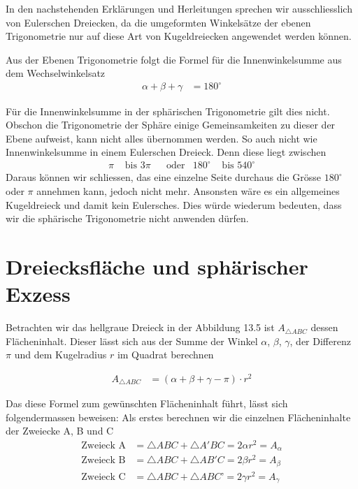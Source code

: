 \begin{refsection}
In den nachstehenden Erklärungen und Herleitungen sprechen wir ausschliesslich von Eulerschen Dreiecken, da die umgeformten Winkelsätze der ebenen Trigonometrie nur auf diese Art von Kugeldreiecken angewendet werden können.

Aus der Ebenen Trigonometrie folgt die Formel für die Innenwinkelsumme aus dem Wechselwinkelsatz
\begin{align*}
\alpha + \beta + \gamma &= 180^{\circ}
\end{align*}

Für die Innenwinkelsumme in der sphärischen Trigonometrie gilt dies nicht. Obschon die Trigonometrie der Sphäre einige Gemeinsamkeiten zu dieser der Ebene aufweist, kann nicht alles übernommen werden.
So auch nicht wie Innenwinkelsumme in einem Eulerschen Dreieck.
Denn diese liegt zwischen
\[
\begin{aligned}
\pi
&\text{ bis }
3\pi
&
&\text{oder}
&
180^{\circ}
&\text{ bis }
540^{\circ}
\end{aligned}
\]
Daraus können wir schliessen, das eine einzelne Seite durchaus die Grösse $180^{\circ}$ oder $\pi$ annehmen kann, jedoch nicht mehr. Ansonsten wäre es ein allgemeines Kugeldreieck und damit kein Eulersches. Dies würde wiederum bedeuten, dass wir die sphärische Trigonometrie nicht anwenden dürfen.



\section{Dreiecksfläche und sphärischer Exzess} \label{Flaeche}
Betrachten wir das hellgraue Dreieck in der Abbildung 13.5 ist $A_{ \triangle{ ABC }}$ dessen Flächeninhalt. Dieser lässt sich aus der Summe der Winkel $\alpha$, $\beta$, $\gamma$, der Differenz $\pi$ und dem Kugelradius $r$ im Quadrat berechnen

\begin{align*}
A_{ \triangle{ ABC }} &= (\alpha + \beta + \gamma - \pi) \cdot r^2
\end{align*}

Das diese Formel zum gewünschten Flächeninhalt führt, lässt sich folgendermassen beweisen:
Als erstes berechnen wir die einzelnen Flächeninhalte der Zweiecke A, B und C
\begin{align*}
\text{Zweieck A}
&=
\triangle{ABC} + \triangle{A'BC} = 2 \alpha r^{ 2 } = A_{ \alpha }\\
\text{Zweieck B}
&=
\triangle{ABC} + \triangle{AB'C} = 2 \beta r^{ 2 } = A_{ \beta }\\
\text{Zweieck C}
&=
\triangle{ABC} + \triangle{ABC’} = 2 \gamma r^{ 2 } = A_{ \gamma }
\end{align*}


\end{refsection}
